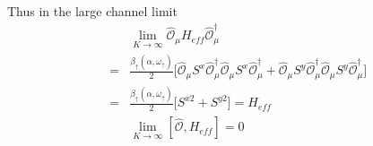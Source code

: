 \documentclass[reprint,prb,superscriptaddress]{revtex4-1}
\begin{document}
%
%
%

Thus in the large channel limit
\begin{eqnarray}
&& \lim_{K\rightarrow \infty}\hat{\mathcal{O}}_{\mu} H_{eff} \hat{\mathcal{O}}_{\mu}^{\dagger}\nonumber\\
 &=& \frac{\beta_{\uparrow}(\alpha,\omega_{\uparrow})}{2} \bigg[ \hat{\mathcal{O}}_{\mu} S^x \hat{\mathcal{O}}_{\mu}^{\dagger} \hat{\mathcal{O}}_{\mu} S^x \hat{\mathcal{O}}_{\mu}^{\dagger}  + \hat{\mathcal{O}}_{\mu} S^y \hat{\mathcal{O}}_{\mu}^{\dagger} \hat{\mathcal{O}}_{\mu} S^y \hat{\mathcal{O}}_{\mu}^{\dagger}  \bigg]\nonumber\\
&=&\frac{\beta_{\uparrow}(\alpha,\omega_{\uparrow})}{2} \bigg[  S^{x2}+S^{y2}  \bigg] = H_{eff} \nonumber\\
&&\lim_{K\rightarrow \infty } [\hat{\mathcal{O}},H_{eff}] = 0
\label{eq:hamiltonian_twisted}
\end{eqnarray}
 
\end{document}
